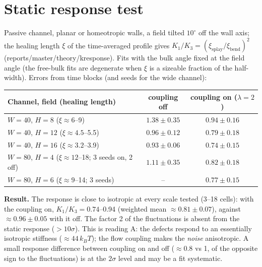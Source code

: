 \documentclass[11pt,a4paper]{article}
\newcommand{\kT}{k_BT}\newcommand{\half}{\tfrac12}\newcommand{\la}{\ell_a}
\begin{document}
\section{Static response test}
Passive channel, planar or homeotropic walls, a field tilted $10^\circ$ off the wall axis; the healing length $\xi$ of the time-averaged profile gives
$K_1/K_3=(\xi_\mathrm{splay}/\xi_\mathrm{bend})^2$ (reports/master/theory/kresponse). Fits with the bulk angle fixed at the field angle (the free-bulk
fits are degenerate when $\xi$ is a sizeable fraction of the half-width). Errors from time blocks (and seeds for the wide channel):
\begin{center}\small
\begin{tabular}{lcc}\toprule
Channel, field (healing length) & coupling off & coupling on ($\lambda=2$)\\\midrule
$W=40$, $H=8$ ($\xi\approx6$--9) & $1.38\pm0.35$ & $0.94\pm0.16$\\
$W=40$, $H=12$ ($\xi\approx4.5$--5.5) & $0.96\pm0.12$ & $0.79\pm0.18$\\
$W=40$, $H=16$ ($\xi\approx3.2$--3.9) & $0.93\pm0.06$ & $0.74\pm0.15$\\
$W=80$, $H=4$ ($\xi\approx12$--18; 3 seeds on, 2 off) & $1.11\pm0.35$ & $0.82\pm0.18$\\
$W=80$, $H=6$ ($\xi\approx9$--14; 3 seeds) & -- & $0.77\pm0.15$\\\bottomrule
\end{tabular}\end{center}
\textbf{Result.} The response is close to isotropic at every scale tested (3--18 cells): with the coupling on, $K_1/K_3=0.74$--0.94 (weighted mean
$\approx0.81\pm0.07$), against $\approx0.96\pm0.05$ with it off. The factor 2 of the fluctuations is absent from the static response
($>10\sigma$). This is reading A: the defects respond to an essentially isotropic stiffness ($\approx44\,\kT$); the flow coupling makes the
\emph{noise} anisotropic. A small response difference between coupling on and off ($\approx0.8$ vs 1, of the opposite sign to the fluctuations)
is at the $2\sigma$ level and may be a fit systematic.
\end{document}
